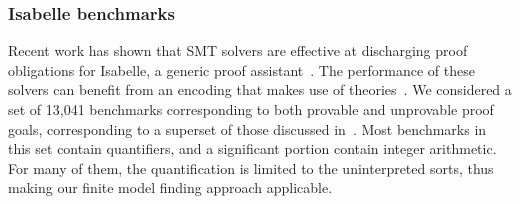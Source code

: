 \documentclass{svjour3}                     %
\begin{document}

\subsubsection*{Isabelle benchmarks}

Recent work has shown that SMT solvers are effective at discharging proof obligations for Isabelle, a generic proof assistant~\cite{paulson2002isabelle}.
The performance of these solvers can benefit from an encoding that makes use of theories~\cite{BBP-11}.
We considered a set of 13,041 benchmarks corresponding to both provable and unprovable proof goals,
corresponding to a superset of those discussed in~\cite{BBP-11}.
Most benchmarks in this set contain quantifiers, and a significant portion contain integer arithmetic.
For many of them, the quantification is limited to the uninterpreted sorts, thus making our finite model finding approach applicable.
\end{document}
